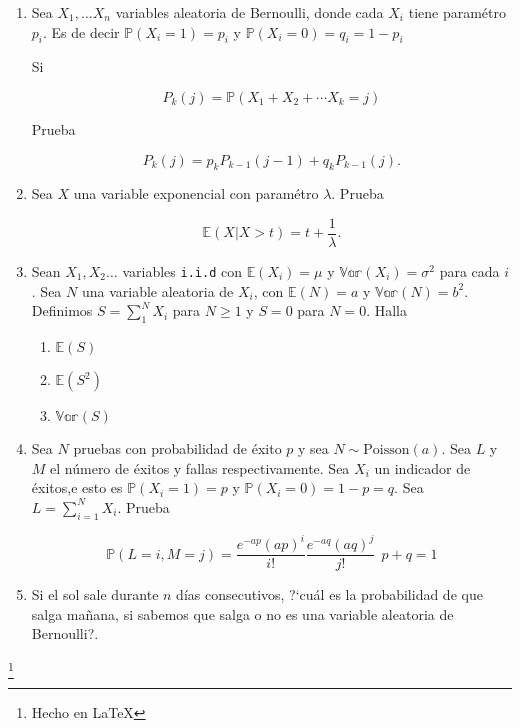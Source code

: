 \documentclass[a4paper,11pt]{report}
\newcommand{\PR}{\mathbb{P}}
\begin{document}
\begin{enumerate}
\item Sea $X_1, \dots X_n$ variables aleatoria de Bernoulli, donde cada $X_i$ tiene param\'etro $p_i$. Es de decir $\PR(X_i = 1) = p_i$ y $\PR(X_i = 0) = q_i = 1 -p_i$

Si 

\[
P_{k}(j) = \PR(X_1 +X_2 + \cdots X_k = j)
\]

Prueba

\[
P_{k}(j) = p_kP_{k -1}(j -1) + q_kP_{k -1}(j).
\]


\item Sea $X$ una variable exponencial con param\'etro $\lambda$. Prueba

\[
\mathbb{E}(X| X > t) = t + \frac{1}{\lambda}.
\]

\item Sean $X_1, X_2\dots $ variables \texttt{i.i.d} con $\mathbb{E}(X_i) = \mu$ y $\mathbb{Var}(X_i) = \sigma ^2$ para cada $i$. Sea $N$ una variable aleatoria de $X_i$, con $\mathbb{E}(N) = a$ y $\mathbb{Var}(N) = b^2$. Definimos $S = \sum_{1}^{N}X_i$ para $N \geq 1$ y $S = 0$ para $N = 0$. Halla

\begin{enumerate}
	\item $\mathbb{E}(S)$
	\item $\mathbb{E}(S^2)$
	\item $\mathbb{Var}(S)$
\end{enumerate}
\item Sea $N$ pruebas con probabilidad de \'exito $p$ y sea $N \sim \text{Poisson}(a)$. Sea $L$ y $M$ el n\'umero de \'exitos y fallas respectivamente. Sea $X_i$ un indicador de \'exitos,e esto es $\PR(X_i = 1) = p$ y $\PR(X_i = 0) = 1 - p = q$. Sea $L = \sum_{i =1}^{N}X_i$. Prueba

\[
\PR(L =i, M =j) = \frac{e^{-ap}(ap)^i}{i!}\frac{e^{-aq}(aq)^j}{j!} \ \ p + q = 1
\]

\item Si el sol sale durante $n$ d\'ias consecutivos, ?`cu\'al es la probabilidad de que salga ma\~nana, si sabemos que salga o no es una variable aleatoria de Bernoulli?.
\end{enumerate}

\begin{flushright}
\footnote{Hecho en \LaTeX}
\end{flushright}
\end{document}
